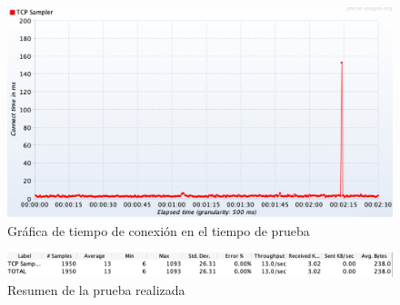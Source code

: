 \begin{figure}[H]
	\centering
	\includegraphics[scale=.3]{Capitulo5/images/real_time_test_connect.png}
	\caption{Gráfica de tiempo de conexión en el tiempo de prueba}
	\label{fig:tcpconnect}
\end{figure} 

\begin{figure}[H]
	\centering
	\includegraphics[scale=.3]{Capitulo5/images/real_time_test_summary.png}
	\caption{Resumen de la prueba realizada}
	\label{fig:tcpsummary}
\end{figure} 